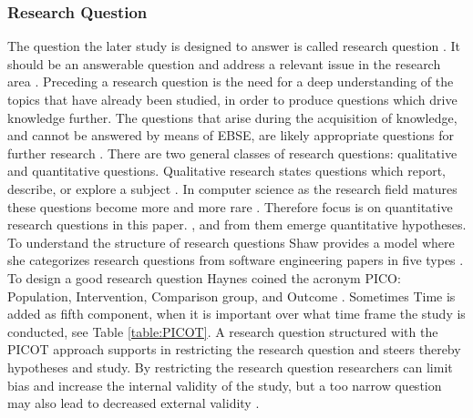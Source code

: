 
\subsubsection{Research Question}

The question the later study is designed to answer is called research question \cite{Vickers}. It should be an answerable question and address a relevant issue in the research area \cite{Dyba2005}. Preceding a research question is the need for a deep understanding of the topics that have already been studied, in order to produce questions which drive knowledge further. The questions that arise during the acquisition of knowledge, and cannot be answered by means of EBSE, are likely appropriate questions for further research \cite{Farrugia2009}. \newline
There are two general classes of research questions: qualitative and quantitative questions. Qualitative research states questions which report, describe, or explore a subject \cite[p. 139-141]{Creswell2014}. In computer science as the research field matures these questions become more and more rare . Therefore focus is on quantitative research questions in this paper.  \cite[p. 143]{Creswell2014}, and from them emerge quantitative hypotheses. \newline
To understand the structure of research questions Shaw provides a model where she categorizes research questions from software engineering papers in five types \cite{Shaw2002} . \newline
To design a good research question Haynes coined the acronym PICO: Population, Intervention, Comparison group, and Outcome \cite{BrianHaynes2006}. Sometimes Time is added as fifth component, when it is important over what time frame the study is conducted, see Table \ref{table:PICOT}. A research question structured with the PICOT approach supports in restricting the research question and steers thereby hypotheses and study. By restricting the research question researchers can limit bias and increase the internal validity of the study, but a too narrow question may also lead to decreased external validity \cite{Farrugia2009}. \\
